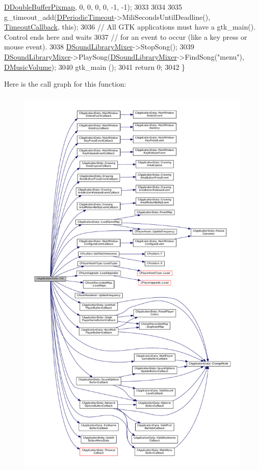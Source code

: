 \begin{DoxyCode}
      \hyperlink{classCApplicationData_aefb64ec5ca3f791f6d431cfc56b9f3b3}{DDoubleBufferPixmap}, 0, 0, 0, 0, -1, -1);
3033     
3034     
3035     g\_timeout\_add(\hyperlink{classCApplicationData_a0265cb7aba9f099faed2a1c8ee588d33}{DPeriodicTimeout}->MiliSecondsUntilDeadline(), 
      \hyperlink{classCApplicationData_af66e15f6935f053b46a11aaa51a869c9}{TimeoutCallback}, \textcolor{keyword}{this});
3036     \textcolor{comment}{// All GTK applications must have a gtk\_main(). Control ends here and waits }
3037     \textcolor{comment}{// for an event to occur (like a key press or mouse event). }
3038     \hyperlink{classCApplicationData_aa1e6876121bb4fb229ec6b930a8a6766}{DSoundLibraryMixer}->StopSong();
3039     \hyperlink{classCApplicationData_aa1e6876121bb4fb229ec6b930a8a6766}{DSoundLibraryMixer}->PlaySong(\hyperlink{classCApplicationData_aa1e6876121bb4fb229ec6b930a8a6766}{DSoundLibraryMixer}->FindSong(\textcolor{stringliteral}{"menu"}), 
      \hyperlink{classCApplicationData_a8bc61af4a83a667102e55cca2a739c3b}{DMusicVolume});
3040     gtk\_main ();
3041     \textcolor{keywordflow}{return} 0;
3042 \}
\end{DoxyCode}
Here is the call graph for this function\+:\nopagebreak
\begin{figure}[H]
\begin{center}
\leavevmode
\includegraphics[height=550pt]{classCApplicationData_ab757e7ad037decb18cefa3f4ad2e1298_cgraph}
\end{center}
\end{figure}
